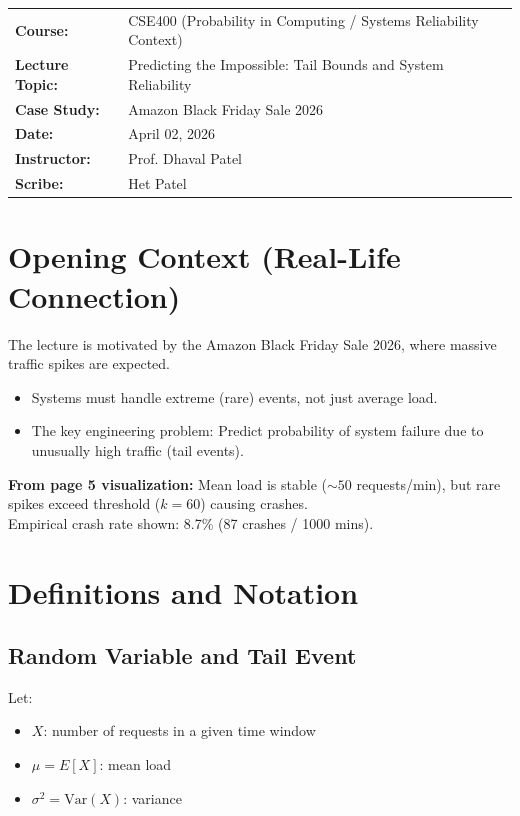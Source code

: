 \documentclass[11pt]{article}
\begin{document}
\begin{flushleft}
\renewcommand{\arraystretch}{1.2}
\begin{tabular}{@{}ll}
\textbf{Course:} & CSE400 (Probability in Computing / Systems Reliability Context) \\
\textbf{Lecture Topic:} & Predicting the Impossible: Tail Bounds and System Reliability \\
\textbf{Case Study:} & Amazon Black Friday Sale 2026 \\
\textbf{Date:} & April 02, 2026 \\
\textbf{Instructor:} & Prof. Dhaval Patel \\
\textbf{Scribe:} & Het Patel \\
\end{tabular}
\end{flushleft}

\vspace{0.3cm}

\section{Opening Context (Real-Life Connection)}
The lecture is motivated by the Amazon Black Friday Sale 2026, where massive traffic spikes are expected. 

\begin{itemize}
    \item Systems must handle extreme (rare) events, not just average load.
    \item The key engineering problem: Predict probability of system failure due to unusually high traffic (tail events).
\end{itemize}

\textbf{From page 5 visualization:}
Mean load is stable ($\sim 50$ requests/min), but rare spikes exceed threshold ($k = 60$) causing crashes. \\
Empirical crash rate shown: 8.7\% (87 crashes / 1000 mins). 

\section{Definitions and Notation}
\subsection{Random Variable and Tail Event}
Let:
\begin{itemize}
    \item $X$: number of requests in a given time window
    \item $\mu = E[X]$: mean load
    \item $\sigma^2 = \text{Var}(X)$: variance
\end{itemize}
\end{document}
